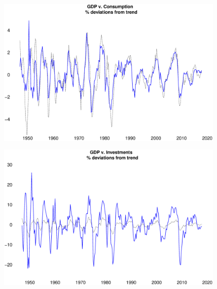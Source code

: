 \documentclass{beamer}
\begin{document}
\begin{frame}
  \begin{figure}
    \includegraphics[scale=.25]{business_cycle.eps}
  \end{figure}
\end{frame}

\begin{frame}
  \begin{figure}
    \includegraphics[scale=.25]{business_cycle2.eps}
  \end{figure}
\end{frame}
\end{document}
